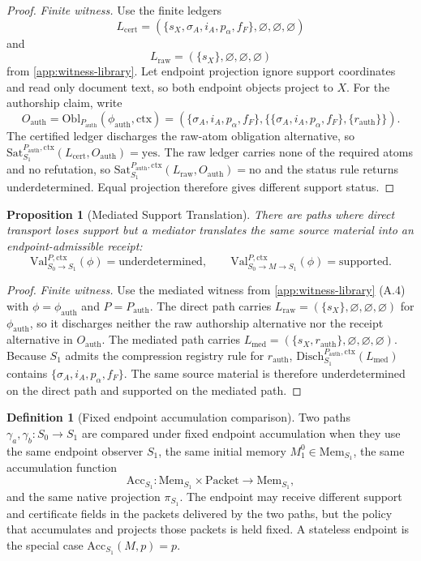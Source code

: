 \documentclass[11pt,twoside]{article}
\newtheorem{proposition}[theorem]{Proposition}
\theoremstyle{definition}
\newtheorem{definition}[theorem]{Definition}
\newcommand{\Obl}{\mathrm{Obl}}
\newcommand{\Sat}{\mathrm{Sat}}
\newcommand{\Disch}{\mathrm{Disch}}
\newcommand{\Val}{\mathrm{Val}}
\newcommand{\Mem}{\mathrm{Mem}}
\newcommand{\Packet}{\mathrm{Packet}}
\newcommand{\Acc}{\mathrm{Acc}}
\newcommand{\ctx}{\mathrm{ctx}}
\newcommand{\supported}{\mathrm{supported}}
\newcommand{\underdetermined}{\mathrm{underdetermined}}
\begin{document}
\begin{proof}
\textit{Finite witness.}
Use the finite ledgers
\[
  L_{\mathrm{cert}}=(\{s_X,\sigma_A,i_A,p_\alpha,f_F\},\varnothing,\varnothing,\varnothing)
\]
and
\[
  L_{\mathrm{raw}}=(\{s_X\},\varnothing,\varnothing,\varnothing)
\]
from \cref{app:witness-library}. Let endpoint projection ignore support
coordinates and read only document text, so both endpoint objects project to
$X$. For the authorship claim, write
\[
  O_{\mathrm{auth}}
  =
  \Obl_{P_{\mathrm{auth}}}(\phi_{\mathrm{auth}},\ctx)
  =
  (\{\sigma_A,i_A,p_\alpha,f_F\},
   \{\{\sigma_A,i_A,p_\alpha,f_F\},\{r_{\mathrm{auth}}\}\}).
\]
The certified ledger discharges the raw-atom obligation alternative, so
$\Sat_{S_1}^{P_{\mathrm{auth}},\ctx}(L_{\mathrm{cert}},O_{\mathrm{auth}})=\mathrm{yes}$.
The raw ledger carries none of the required atoms and no refutation, so
$\Sat_{S_1}^{P_{\mathrm{auth}},\ctx}(L_{\mathrm{raw}},O_{\mathrm{auth}})=\mathrm{no}$ and
the status rule returns $\underdetermined$. Equal projection therefore gives
different support status.
\end{proof}

\begin{proposition}[Mediated Support Translation]
\label{prop:mediated-support-translation}
There are paths where direct transport loses support but a mediator translates
the same source material into an endpoint-admissible receipt:
\[
  \Val_{S_0\to S_1}^{P,\ctx}(\phi)=\underdetermined,
  \qquad
  \Val_{S_0\to M\to S_1}^{P,\ctx}(\phi)=\supported.
\]
\end{proposition}

\begin{proof}
\textit{Finite witness.}
Use the mediated witness from \cref{app:witness-library} (A.4) with
$\phi=\phi_{\mathrm{auth}}$ and $P=P_{\mathrm{auth}}$. The direct path carries
$L_{\mathrm{raw}}=(\{s_X\},\varnothing,\varnothing,\varnothing)$ for
$\phi_{\mathrm{auth}}$, so it discharges neither the raw authorship alternative
nor the receipt alternative in $O_{\mathrm{auth}}$. The mediated path carries
$L_{\mathrm{med}}=(\{s_X,r_{\mathrm{auth}}\},\varnothing,\varnothing,\varnothing)$.
Because $S_1$ admits the compression registry rule for $r_{\mathrm{auth}}$,
$\Disch_{S_1}^{P_{\mathrm{auth}},\ctx}(L_{\mathrm{med}})$ contains
$\{\sigma_A,i_A,p_\alpha,f_F\}$. The same source material is therefore
underdetermined on the direct path and supported on the mediated path.
\end{proof}

\begin{definition}[Fixed endpoint accumulation comparison]
Two paths $\gamma_a,\gamma_b:S_0\to S_1$ are compared under fixed endpoint
accumulation when they use the same endpoint observer $S_1$, the same initial
memory $M_1^0\in\Mem_{S_1}$, the same accumulation function
\[
  \Acc_{S_1}:\Mem_{S_1}\times\Packet\to\Mem_{S_1},
\]
and the same native projection $\pi_{S_1}$. The endpoint may receive different
support and certificate fields in the packets delivered by the two paths, but
the policy that accumulates and projects those packets is held fixed. A
stateless endpoint is the special case
$\Acc_{S_1}(M,p)=p$.
\end{definition}
\end{document}
